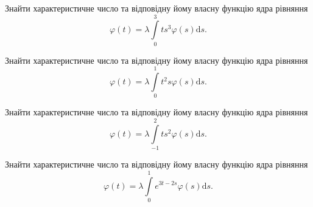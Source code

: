 \documentclass[12pt]{extarticle}
\begin{document}
\begin{Exercise}
Знайти характеристичне число та відповідну йому власну функцію ядра рівняння \[\varphi(t) = \lambda\int\limits_{0}^{3} t s^3\varphi(s) \mathrm{d}s.\]
\end{Exercise}

\begin{Exercise}
Знайти характеристичне число та відповідну йому власну функцію ядра рівняння \[\varphi(t) = \lambda\int\limits_{0}^{1} t^2 s \varphi(s) \mathrm{d}s.\]
\end{Exercise}

\begin{Exercise}
Знайти характеристичне число та відповідну йому власну функцію ядра рівняння \[\varphi(t) = \lambda\int\limits_{-1}^{2} t s^2 \varphi(s) \mathrm{d}s.\]
\end{Exercise}

\begin{Exercise}
Знайти характеристичне число та відповідну йому власну функцію ядра рівняння \[\varphi(t) = \lambda\int\limits_{0}^{1} e^{3t-2s} \varphi(s) \mathrm{d}s.\]
\end{Exercise}
\end{document}

